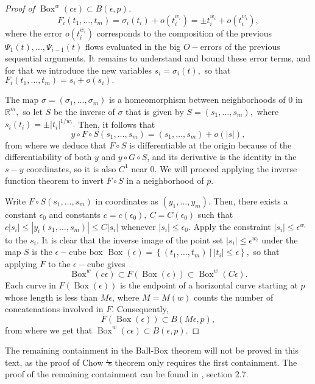 \documentclass[12pt, letterpaper, reqno]{amsart}
\theoremstyle{definition}
\theoremstyle{plain}
\theoremstyle{remark}
\providecommand{\DIFdel}[1]{{\protect\color{red}\sout{#1}}}                      %
\providecommand{\DIFdelbegin}{} %
\providecommand{\DIFdelend}{} %
\newcommand{\DIFscaledelfig}{0.5}
\newlength{\DIFdelgraphicswidth} %
\newlength{\DIFdelgraphicsheight} %
\newcommand{\DIFdelincludegraphics}[2][]{%
\sbox{\DIFdelgraphicsbox}{\DIFOincludegraphics[#1]{#2}}%
\settoboxwidth{\DIFdelgraphicswidth}{\DIFdelgraphicsbox} %
\settoboxtotalheight{\DIFdelgraphicsheight}{\DIFdelgraphicsbox} %
\scalebox{\DIFscaledelfig}{%
\parbox[b]{\DIFdelgraphicswidth}{\usebox{\DIFdelgraphicsbox}\\[-\baselineskip] \rule{\DIFdelgraphicswidth}{0em}}\llap{\resizebox{\DIFdelgraphicswidth}{\DIFdelgraphicsheight}{%
\setlength{\unitlength}{\DIFdelgraphicswidth}%
\begin{picture}(1,1)%
\thicklines\linethickness{2pt} %
{\color[rgb]{1,0,0}\put(0,0){\framebox(1,1){}}}%
{\color[rgb]{1,0,0}\put(0,0){\line( 1,1){1}}}%
{\color[rgb]{1,0,0}\put(0,1){\line(1,-1){1}}}%
\end{picture}%
}\hspace*{3pt}}} %
} %
\DeclareRobustCommand{\DIFdelbegin}{\DIFOdelbegin \let\includegraphics\DIFdelincludegraphics} %
\DeclareRobustCommand{\DIFdelend}{\DIFOaddend \let\includegraphics\DIFOincludegraphics} %
\begin{document}
\begin{proof}[Proof of $\operatorname{Box}^w(c\epsilon)\subset B(\epsilon, p)$]
$$ F_i(t_1,\dots,t_m) = \sigma_i(t_i) + o(t_i^{w_i}) = \pm t_i^{w_i} + o(t_i^{w_i}), $$ 
where the error $ o(t_i^{w_i}) $ corresponds to the composition of the previous $ \Psi_1(t), \dots,\Psi_{i-1}(t) $ flows evaluated in the big $ O- $errors of the previous sequential arguments. It remains to understand and bound these error terms, and for that we introduce the new variables $ s_i=\sigma_i(t), $ so that $ F_i(t_1,\dots,t_m)= s_i + o(s_i). $  

The map $ \sigma=(\sigma_1,\dots,\sigma_m) $ is a homeomorphism between neighborhoods of $ 0 $ in $ \mathbb{R}^m, $ so let $ S $ be the inverse of $ \sigma $ that is given by $ S=(s_1,\dots,s_m), $ where $ s_i(t_i)=\pm |t_i|^{1/w_i}. $ Then, it follows that
$$ y\circ F\circ S (s_1,\dots,s_m) = (s_1,\dots,s_m) + o(|s|), $$ 
from where we deduce that $ F\circ S$ is differentiable at the origin because of the differentiability of both $ y $ and $ y\circ G\circ S $, and its derivative is the identity in the $ s-y $ coordinates, so it is also $ C^1 $ near $ 0. $ We will proceed applying the inverse function theorem to invert $ F\circ S $ in a neighborhood of $ p. $ 

Write $ F\circ S(s_1,\dots,s_m) $ in coordinates as $ (y_1,\dots,y_m).$ Then, there exists a constant $ \epsilon_0 $ and constants $ c=c(\epsilon_0), \ C=C(\epsilon_0) $ such that $ c|s_i| \leq |y_i(s_1,\dots,s_m)|  \leq C|s_i|$ whenever $ |s_i|\leq \epsilon_0. $ Apply the constraint $ |s_i|\leq \epsilon^{w_i} $ to the $ s_i. $ It is clear that the inverse image of the point set $ |s_i|\leq \epsilon^{w_i} $ under the map $ S $ is the $ \epsilon- $cube box $ \operatorname{Box}(\epsilon)= \left\{ (t_1,\dots,t_m)\ | \ |t_i|\leq \epsilon \right\},  $  so that applying $ F $ to the $ \epsilon- $cube gives
$$ \operatorname{Box}^{w}(c\epsilon) \subset F( \operatorname{Box}(\epsilon) ) \subset \operatorname{Box}^w(C\epsilon).   $$ 
Each curve in $ F( \operatorname{Box} (\epsilon) )$ is the endpoint of a horizontal curve starting at $ p $ whose length is less than $ M\epsilon $, where $ M=M(w) $ counts the number of concatenations involved in $ F. $ Consequently,
$$ F( \operatorname{Box} (\epsilon)) \subset B(M\epsilon, p), $$ 
from where we get that $ \operatorname{Box}^w (c\epsilon)\subset B(\epsilon,p). $ 
\end{proof}
The remaining containment in the Ball-Box theorem will not be proved in this text, as the proof of Chow \DIFdelbegin \DIFdel{'s }\DIFdelend theorem only requires the first containment. The proof of the remaining containment can be found in \cite{montgomery2002tour}, section 2.7.
\end{document}
